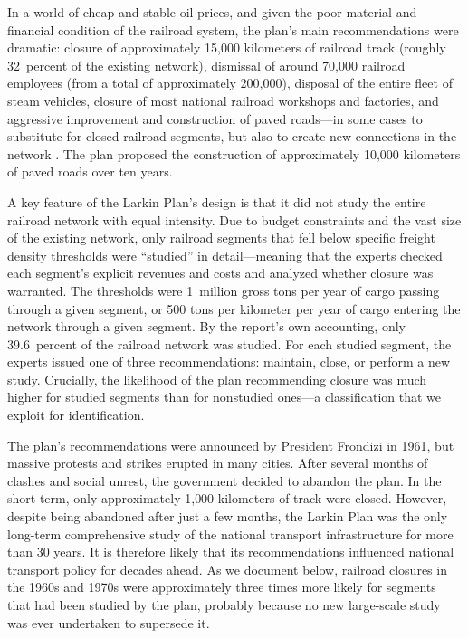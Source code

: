 In a world of cheap and stable oil prices, and given the poor
material and financial condition of the railroad system, the plan's
main recommendations were dramatic: closure of approximately
15{,}000 kilometers of railroad track (roughly 32~percent of the
existing network), dismissal of around 70{,}000 railroad employees
(from a total of approximately 200{,}000), disposal of the entire
fleet of steam vehicles, closure of most national railroad workshops
and factories, and aggressive improvement and construction of paved
roads—in some cases to substitute for closed railroad segments, but
also to create new connections in the network \citep{larkin1962}. The
plan proposed the construction of approximately 10{,}000 kilometers of
paved roads over ten years.

A key feature of the Larkin Plan's design is that it did not study
the entire railroad network with equal intensity. Due to budget
constraints and the vast size of the existing network, only railroad
segments that fell below specific freight density thresholds were
``studied'' in detail—meaning that the experts checked each
segment's explicit revenues and costs and analyzed whether closure
was warranted. The thresholds were 1~million gross tons per year of
cargo passing through a given segment, or 500 tons per kilometer per
year of cargo entering the network through a given segment. By the
report's own accounting, only 39.6~percent of the railroad network
was studied. For each studied
segment, the experts issued one of three recommendations: maintain,
close, or perform a new study. Crucially, the likelihood of the plan
recommending closure was much higher for studied segments than for
nonstudied ones—a classification that we exploit for identification.

The plan's recommendations were announced by President Frondizi in
1961, but massive protests and strikes erupted in many cities. After
several months of clashes and social unrest, the government decided
to abandon the plan. In the short term, only approximately
1{,}000 kilometers of track were closed. However, despite being
abandoned after just a few months, the Larkin Plan was the only
long-term comprehensive study of the national transport
infrastructure for more than 30 years. It is therefore likely that
its recommendations influenced national transport policy for decades
ahead. As we document below, railroad closures in the 1960s and
1970s were approximately three times more likely for segments that
had been studied by the plan, probably because no new large-scale
study was ever undertaken to supersede it.

